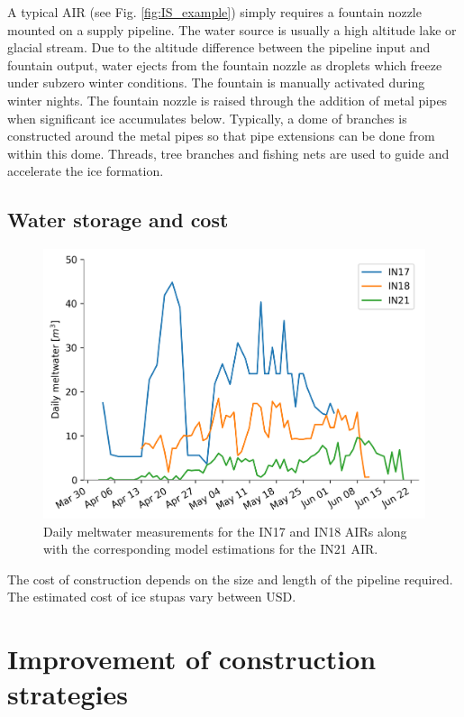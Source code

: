 A typical AIR (see Fig. \ref{fig:IS_example}) simply requires a fountain nozzle mounted on a supply pipeline.
The water source is usually a high altitude lake or glacial stream. Due to the altitude difference between the
pipeline input and fountain output, water ejects from the fountain nozzle as droplets which freeze under subzero
winter conditions. The fountain is manually activated during winter nights. The fountain nozzle is raised
through the addition of metal pipes when significant ice accumulates below.  Typically, a dome of branches is
constructed around the metal pipes so that pipe extensions can be done from within this dome. Threads, tree
branches and fishing nets are used to guide and accelerate the ice formation.

\subsection{Water storage and cost}

\begin{figure}[t]
\centering
\includegraphics[width=12cm]{figs/melt.png}

\caption{Daily meltwater measurements for the IN17 and IN18 AIRs along with the corresponding model estimations
for the IN21 AIR. }

\label{fig:AIRdesigns}
\end{figure}

The cost of construction depends on the size and length of the pipeline required. The estimated cost of ice
stupas vary between USD.

\section{Improvement of construction strategies}

